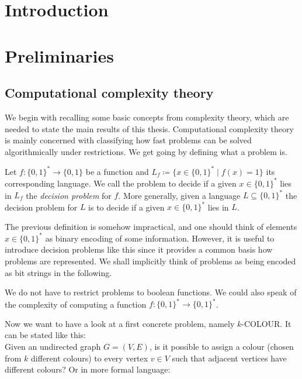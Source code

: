 \section*{Introduction}

\newpage

\section{Preliminaries}
\subsection{Computational complexity theory}
We begin with recalling some basic concepts from complexity theory, which are needed to state the main results of this thesis.
Computational complexity theory is mainly concerned with classifying how fast problems can be solved algorithmically
under restrictions.
We get going by defining what a problem is.

\begin{Definition}
 Let $f \colon {\lbrace 0,1 \rbrace}^* \to {\lbrace 0,1 \rbrace}$ be a function and $L_f \coloneqq {\lbrace 
 x \in {\lbrace 0,1 \rbrace}^*  \; | \; f(x) = 1 \rbrace} $ its corresponding language. We call the 
 problem to decide if a given $x \in {\lbrace 0,1 \rbrace}^*$ lies in $L_f$ the \emph{decision problem} for $f$.
 More generally, given a language $L \subseteq {\lbrace 0,1 \rbrace}^*$ the decision problem for $L$ is to decide
 if a given $x \in {\lbrace 0,1 \rbrace}^* $ lies in $L$.
\end{Definition}

\begin{Remark}
The previous definition is somehow impractical, and one should think of elements $x \in {\lbrace 0,1 \rbrace}^*$ as binary encoding
of some information. However, it is useful to introduce decision problems like this since it provides a common basis how problems
are represented. We shall implicitly think of problems as being encoded as bit strings in the following.
\end{Remark}

\begin{Remark}
 We do not have to restrict problems to boolean functions. We could also speak of the complexity of
 computing a function $f \colon {\lbrace 0,1 \rbrace}^* \to {\lbrace 0,1 \rbrace}^*$. 
\end{Remark}


Now we want to have a look at a first concrete problem, namely $k$-COLOUR. It can be stated like this: \\
 Given an undirected graph $ G = (V,E)$, is it possible to assign a colour (chosen from $k$ different colours) to every vertex 
 $v \in V$ such that adjacent vertices have different colours? Or in more formal language:

